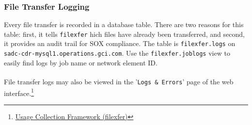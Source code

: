 


\subsubsection{File Transfer Logging}
Every file transfer is recorded in a database table. There are
two reasons for this table: first, it tells \texttt{filexfer}
hich files have already been transferred, and second, it
provides an audit trail for SOX compliance. The table is
\texttt{filexfer.logs} on
\texttt{sadc-cdr-mysql1.operations.gci.com}. Use the
\texttt{filexfer.joblogs} view to easily find logs by job name
or network element ID.\\
\\
File transfer logs may also be viewed in the
'\texttt{Logs \& Errors}' page of the web
interface.\footnote{\href{http://oss-wiki.operations.gci.com/dev/index.php/Usage\_Collection\_Framework\_(filexfer)}{Usage
    Collection Framework (filexfer)}}
